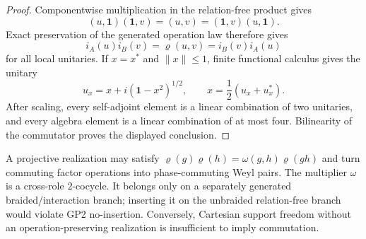 \documentclass[12pt,a4paper]{article}
\begin{document}
\begin{proof}
Componentwise multiplication in the relation-free product gives
\[
 (u,\mathbf1)(\mathbf1,v)=(u,v)
 =(\mathbf1,v)(u,\mathbf1).
\]
Exact preservation of the generated operation law therefore gives
\[
 i_A(u)i_B(v)=\varrho(u,v)=i_B(v)i_A(u)
\]
for all local unitaries.  If \(x=x^*\) and \(\|x\|\le1\), finite functional
calculus gives the unitary
\[
 u_x=x+i(\mathbf1-x^2)^{1/2},
 \qquad x=\frac12(u_x+u_x^*).
\]
After scaling, every self-adjoint element is a linear combination of two
unitaries, and every algebra element is a linear combination of at most four.
Bilinearity of the commutator proves the displayed conclusion.
\end{proof}

\begin{remark}
\label{p4:rem:product-operation-exactness}
A projective realization may satisfy
\(\varrho(g)\varrho(h)=\omega(g,h)\varrho(gh)\) and turn commuting factor
operations into phase-commuting Weyl pairs.  The multiplier \(\omega\) is a
cross-role \(2\)-cocycle.  It belongs only on a separately generated
braided/interaction branch; inserting it on the unbraided relation-free
branch would violate GP2 no-insertion.  Conversely, Cartesian support freedom
without an operation-preserving realization is insufficient to imply
commutation.
\end{remark}
\end{document}
